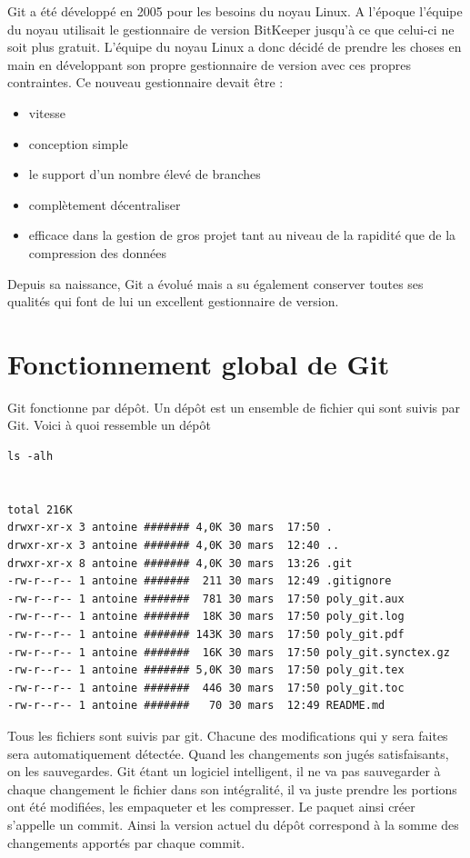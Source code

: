 \documentclass[a4paper]{article}
\begin{document}
Git a été développé en 2005 pour les besoins du noyau Linux. A l'époque l'équipe du noyau utilisait le gestionnaire de version BitKeeper jusqu'à ce que celui-ci ne soit plus gratuit. L'équipe du noyau Linux a donc décidé de prendre les choses en main en développant son propre gestionnaire de version avec ces propres contraintes. Ce nouveau gestionnaire devait être :
\begin{itemize}

\item vitesse
\item conception simple
\item le support d'un nombre élevé de branches
\item complètement décentraliser
\item efficace dans la gestion de gros projet tant au niveau de la rapidité que de la compression des données

\end{itemize}

Depuis sa naissance, Git a évolué mais a su également conserver toutes ses qualités qui font de lui un excellent gestionnaire de version.

\section{Fonctionnement global de Git}

Git fonctionne par dépôt. Un dépôt est un ensemble de fichier qui sont suivis par Git. Voici à quoi ressemble un dépôt

\begin{verbatim}
ls -alh


total 216K
drwxr-xr-x 3 antoine ####### 4,0K 30 mars  17:50 .
drwxr-xr-x 3 antoine ####### 4,0K 30 mars  12:40 ..
drwxr-xr-x 8 antoine ####### 4,0K 30 mars  13:26 .git
-rw-r--r-- 1 antoine #######  211 30 mars  12:49 .gitignore
-rw-r--r-- 1 antoine #######  781 30 mars  17:50 poly_git.aux
-rw-r--r-- 1 antoine #######  18K 30 mars  17:50 poly_git.log
-rw-r--r-- 1 antoine ####### 143K 30 mars  17:50 poly_git.pdf
-rw-r--r-- 1 antoine #######  16K 30 mars  17:50 poly_git.synctex.gz
-rw-r--r-- 1 antoine ####### 5,0K 30 mars  17:50 poly_git.tex
-rw-r--r-- 1 antoine #######  446 30 mars  17:50 poly_git.toc
-rw-r--r-- 1 antoine #######   70 30 mars  12:49 README.md

\end{verbatim}

Tous les fichiers sont suivis par git. Chacune des modifications qui y sera faites sera automatiquement détectée. Quand les changements son jugés satisfaisants, on les sauvegardes. Git étant un logiciel intelligent, il ne va pas sauvegarder à chaque changement le fichier dans son intégralité, il va juste prendre les portions ont été modifiées, les empaqueter et les compresser. Le paquet ainsi créer s'appelle un commit. Ainsi la version actuel du dépôt correspond à la \og somme \fg des changements apportés par chaque commit.
\end{document}
